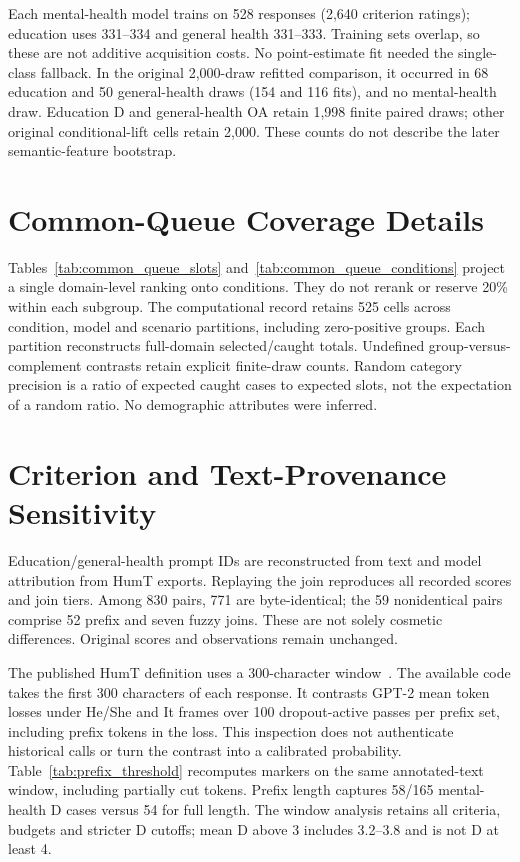 






Each mental-health model trains on 528 responses (2,640 criterion ratings); education uses 331--334 and general health 331--333. Training sets overlap, so these are not additive acquisition costs. No point-estimate fit needed the single-class fallback. In the original 2,000-draw refitted comparison, it occurred in 68 education and 50 general-health draws (154 and 116 fits), and no mental-health draw. Education D and general-health OA retain 1,998 finite paired draws; other original conditional-lift cells retain 2,000. These counts do not describe the later semantic-feature bootstrap.

\clearpage
\section{Common-Queue Coverage Details}\label{app:queue}
Tables~\ref{tab:common_queue_slots} and~\ref{tab:common_queue_conditions} project a single domain-level ranking onto conditions. They do not rerank or reserve 20\% within each subgroup. The computational record retains 525 cells across condition, model and scenario partitions, including zero-positive groups. Each partition reconstructs full-domain selected/caught totals. Undefined group-versus-complement contrasts retain explicit finite-draw counts. Random category precision is a ratio of expected caught cases to expected slots, not the expectation of a random ratio. No demographic attributes were inferred.



\clearpage
\section{Criterion and Text-Provenance Sensitivity}\label{app:sensitivity}
Education/general-health prompt IDs are reconstructed from text and model attribution from HumT exports. Replaying the join reproduces all recorded scores and join tiers. Among 830 pairs, 771 are byte-identical; the 59 nonidentical pairs comprise 52 prefix and seven fuzzy joins. These are not solely cosmetic differences. Original scores and observations remain unchanged.

The published HumT definition uses a 300-character window~\cite{cheng2025humt}. The available code takes the first 300 characters of each response. It contrasts GPT-2 mean token losses under He/She and It frames over 100 dropout-active passes per prefix set, including prefix tokens in the loss. This inspection does not authenticate historical calls or turn the contrast into a calibrated probability. Table~\ref{tab:prefix_threshold} recomputes markers on the same annotated-text window, including partially cut tokens. Prefix length captures 58/165 mental-health D cases versus 54 for full length. The window analysis retains all criteria, budgets and stricter D cutoffs; mean D above 3 includes 3.2--3.8 and is not D at least 4.


